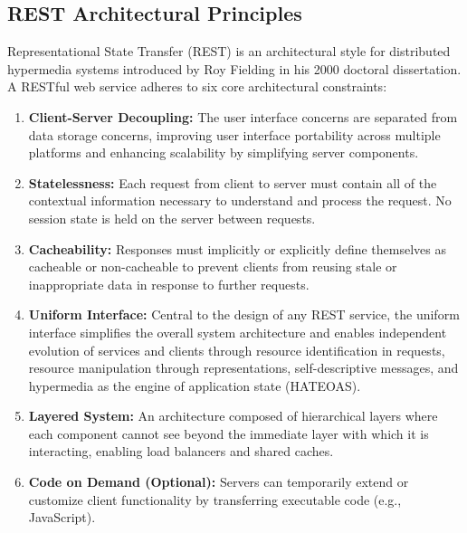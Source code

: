 \documentclass[11pt,a4paper]{article}
\begin{document}
\subsection{REST Architectural Principles}
Representational State Transfer (REST) is an architectural style for distributed hypermedia systems introduced by Roy Fielding in his 2000 doctoral dissertation. A RESTful web service adheres to six core architectural constraints:
\begin{enumerate}
    \item \textbf{Client-Server Decoupling:} The user interface concerns are separated from data storage concerns, improving user interface portability across multiple platforms and enhancing scalability by simplifying server components.
    \item \textbf{Statelessness:} Each request from client to server must contain all of the contextual information necessary to understand and process the request. No session state is held on the server between requests.
    \item \textbf{Cacheability:} Responses must implicitly or explicitly define themselves as cacheable or non-cacheable to prevent clients from reusing stale or inappropriate data in response to further requests.
    \item \textbf{Uniform Interface:} Central to the design of any REST service, the uniform interface simplifies the overall system architecture and enables independent evolution of services and clients through resource identification in requests, resource manipulation through representations, self-descriptive messages, and hypermedia as the engine of application state (HATEOAS).
    \item \textbf{Layered System:} An architecture composed of hierarchical layers where each component cannot see beyond the immediate layer with which it is interacting, enabling load balancers and shared caches.
    \item \textbf{Code on Demand (Optional):} Servers can temporarily extend or customize client functionality by transferring executable code (e.g., JavaScript).
\end{enumerate}
\end{document}
